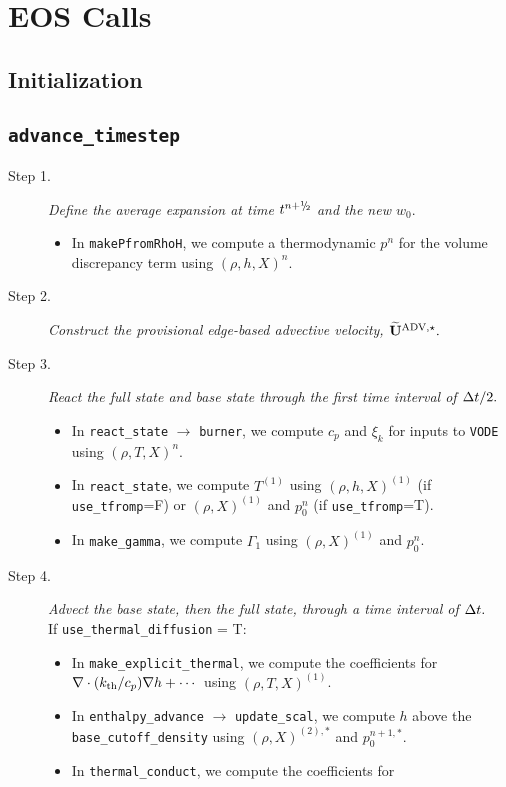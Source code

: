 \section{EOS Calls}
\subsection{Initialization}
\subsection{{\tt advance\_timestep}}
\begin{description}
\item[Step 1.] {\em Define the average expansion at time $t^\nph$ and the new $w_0.$}
\begin{itemize}
\item In {\tt makePfromRhoH}, we compute a thermodynamic $p^n$ for the volume discrepancy 
term using $(\rho,h,X)^n$.
\end{itemize}
\item[Step 2.] {\em Construct the provisional edge-based advective velocity, $\widetilde{\mathbf{U}}^{\mathrm{ADV},\star}.$}
\item[Step 3.] {\em React the full state and base state through the first time interval 
of $\Delta t/2.$}
\begin{itemize}
\item In {\tt react\_state} $\rightarrow$ {\tt burner}, we compute $c_p$ and $\xi_k$ 
for inputs to {\tt VODE} using $(\rho,T,X)^n$.
\item In {\tt react\_state}, we compute $T^{(1)}$ using $(\rho,h,X)^{(1)}$ 
(if {\tt use\_tfromp}=F) or $(\rho,X)^{(1)}$ and $p_0^n$ (if {\tt use\_tfromp}=T).
\item In {\tt make\_gamma}, we compute $\Gamma_1$ using $(\rho,X)^{(1)}$ and $p_0^n$.
\end{itemize}
\item[Step 4.] {\em Advect the base state, then the full state, through a time interval 
of $\Delta t.$}\\
If {\tt use\_thermal\_diffusion} = T:
\begin{itemize}
\item In {\tt make\_explicit\_thermal}, we compute the coefficients for 
$\nabla\cdot(k_{\rm th}/c_p)\nabla h + \cdots$ using $(\rho,T,X)^{(1)}$.
\item In {\tt enthalpy\_advance} $\rightarrow$ {\tt update\_scal}, we compute $h$ above
the {\tt base\_cutoff\_density} using $(\rho,X)^{(2),*}$ and $p_0^{n+1,*}$.
\item In {\tt thermal\_conduct}, we compute the coefficients for 

\end{itemize}
\end{description}
